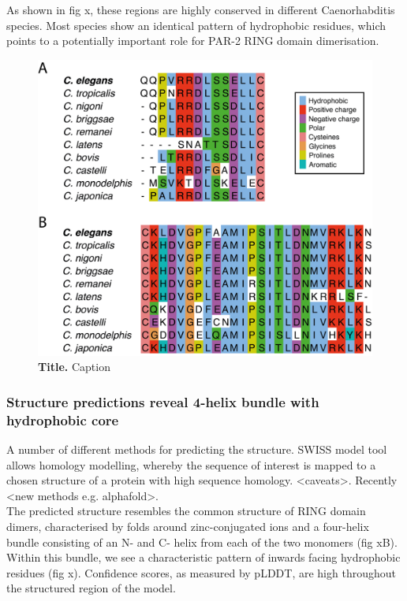 \documentclass[12pt]{"article"}
\newcommand{\mycaption}[2]{\caption[#1]{\textbf{#1.} #2}}
\begin{document}
As shown in fig x, these regions are highly conserved in different Caenorhabditis species. Most species show an identical pattern of hydrophobic residues, which points to a potentially important role for PAR-2 RING domain dimerisation. \\

\begin{figure}[!h]
\includegraphics[scale=1]{alignments_par2}
\setlength{\abovecaptionskip}{20pt}
\centering
\mycaption{Title}{Caption}
\label{fig:alignments_par2}
\end{figure}

\clearpage
\subsubsection{Structure predictions reveal 4-helix bundle with hydrophobic core}

A number of different methods for predicting the structure. SWISS model tool allows homology modelling, whereby the sequence of interest is mapped to a chosen structure of a protein with high sequence homology. <caveats>. Recently <new methods e.g. alphafold>. \citep{Jumper2021} \\

The predicted structure resembles the common structure of RING domain dimers, characterised by folds around zinc-conjugated ions and a four-helix bundle consisting of an N- and C- helix from each of the two monomers (fig xB). Within this bundle, we see a characteristic pattern of inwards facing hydrophobic residues (fig x). Confidence scores, as measured by pLDDT, are high throughout the structured region of the model.\\
\end{document}
